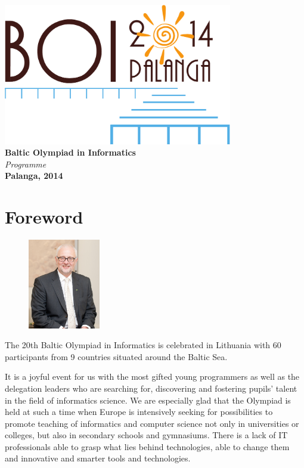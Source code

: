 \documentclass[a5paper,10pt,twoside]{book}
\begin{document}
\begin{titlepage}
\begin{center}
\includegraphics[width=10cm]{boi2014}\\[2cm]
{\bfseries\Huge Baltic Olympiad in Informatics}\\[1.5cm]
{\Huge\it Programme}\\
\vfill
{\bfseries\LARGE Palanga, 2014}
\end{center}
\end{titlepage}

\chapter{Foreword}

\begin{figure}
  \begin{center}
    \vspace{-20pt}
    \includegraphics[width=0.28\textwidth]{ministras}
  \end{center}
\end{figure}
The 20th Baltic Olympiad in Informatics is celebrated in Lithuania with 60
participants from 9 countries situated around the Baltic Sea.

It is a joyful event for us with the most gifted young programmers as well as
the delegation leaders who are searching for, discovering and fostering pupils'
talent in the field of informatics science. We are especially glad that the
Olympiad is held at such a time when Europe is intensively seeking for
possibilities to promote teaching of informatics and computer science not only
in universities or colleges, but also in secondary schools and gymnasiums. There
is a lack of IT professionals able to grasp what lies behind technologies, able
to change them and innovative and smarter tools and technologies.
\end{document}
